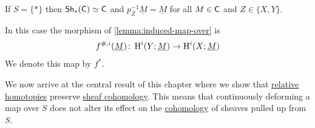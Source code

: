 \documentclass[../../main]{subfiles}
\begin{document}
\begin{remark}
  If \(S = \{\ast\}\) then \hyperref[ex:one-point-sheaves-are-category]{\(\mathsf{Sh}_{\ast}(\mathsf{C}) \simeq \mathsf{C}\)} and \(p_{Z}^{-1} \underline{M} = \underline{M}\) for all \(M \in \mathsf{C}\) and \(Z \in \{X, Y\}\).

  In this case the morphism of \autoref{lemma:induced-map-over} is
  \begin{equation*}
    f^{\#, i}(\underline{M})\colon \operatorname{H}^{i}(Y; \underline{M}) \to \operatorname{H}^{i}(X; \underline{M})
  \end{equation*}
  We denote this map by \(f^{\ast}\). 
\end{remark}

We now arrive at the central result of this chapter where we show that \hyperref[def:homotopy-over]{relative homotopies} preserve \hyperref[def:sheaf-cohomology]{sheaf cohomology}.
This means that continuously deforming a map over \(S\) does not alter its effect on the \hyperref[def:sheaf-cohomology]{cohomology} of sheaves pulled up from \(S\).
\end{document}
